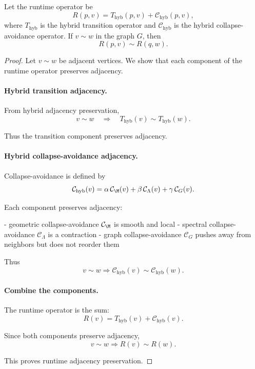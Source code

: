 \begin{lemma}
Let the runtime operator be
\[
R(p,v)
=
T_{\mathrm{hyb}}(p,v)
+
\mathcal{C}_{\mathrm{hyb}}(p,v),
\]
where $T_{\mathrm{hyb}}$ is the hybrid transition operator and
$\mathcal{C}_{\mathrm{hyb}}$ is the hybrid collapse-avoidance operator.
If $v \sim w$ in the graph $G$, then
\[
R(p,v) \sim R(q,w).
\]
\end{lemma}

\begin{proof}
Let $v \sim w$ be adjacent vertices.  
We show that each component of the runtime operator preserves adjacency.

\paragraph{Hybrid transition adjacency.}
From hybrid adjacency preservation,
\[
v \sim w \quad\Rightarrow\quad T_{\mathrm{hyb}}(v) \sim T_{\mathrm{hyb}}(w).
\]

Thus the transition component preserves adjacency.

\paragraph{Hybrid collapse-avoidance adjacency.}
Collapse-avoidance is defined by
\[
\mathcal{C}_{\mathrm{hyb}}(v)
=
\alpha\,\mathcal{C}_\M(v)
+
\beta\,\mathcal{C}_\Lambda(v)
+
\gamma\,\mathcal{C}_G(v).
\]

Each component preserves adjacency:

- geometric collapse-avoidance $\mathcal{C}_\M$ is smooth and local  
- spectral collapse-avoidance $\mathcal{C}_\Lambda$ is a contraction  
- graph collapse-avoidance $\mathcal{C}_G$ pushes away from neighbors but does not reorder them  

Thus
\[
v \sim w \Rightarrow \mathcal{C}_{\mathrm{hyb}}(v) \sim \mathcal{C}_{\mathrm{hyb}}(w).
\]

\paragraph{Combine the components.}
The runtime operator is the sum:
\[
R(v) = T_{\mathrm{hyb}}(v) + \mathcal{C}_{\mathrm{hyb}}(v).
\]

Since both components preserve adjacency,
\[
v \sim w \Rightarrow R(v) \sim R(w).
\]

This proves runtime adjacency preservation.
\end{proof}

